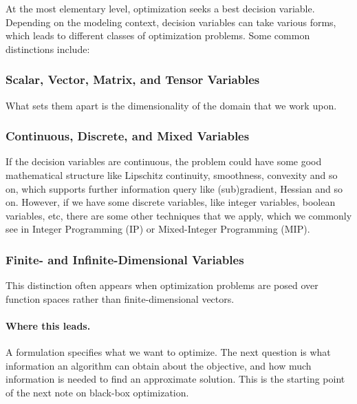 \documentclass[11pt]{article}
\begin{document}
At the most elementary level, optimization seeks a best decision variable. 
Depending on the modeling context, decision variables can take various forms, which leads to different classes of optimization problems. 
Some common distinctions include:
\subsubsection{Scalar, Vector, Matrix, and Tensor Variables}
What sets them apart is the dimensionality of the domain that we work upon. 
\subsubsection{Continuous, Discrete, and Mixed Variables}
If the decision variables are continuous, the problem could have some good mathematical structure like Lipschitz continuity, smoothness, convexity and so on, which supports further information query like (sub)gradient, Hessian and so on. However, if we have some discrete variables, like integer variables, boolean variables, etc, there are some other techniques that we apply, which we commonly see in Integer Programming (IP) or Mixed-Integer Programming (MIP).
\subsubsection{Finite- and Infinite-Dimensional Variables}
This distinction often appears when optimization problems are posed over function spaces rather than finite-dimensional vectors.




\paragraph{Where this leads.}
A formulation specifies what we want to optimize. The next question is what information an algorithm can obtain about the objective, and how much information is needed to find an approximate solution. This is the starting point of the next note on black-box optimization.
\end{document}
